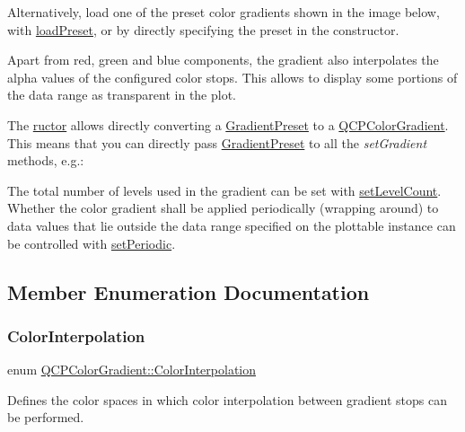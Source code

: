 Alternatively, load one of the preset color gradients shown in the image below, with \hyperlink{class_q_c_p_color_gradient_aa0aeec1528241728b9671bf8e60b1622}{load\+Preset}, or by directly specifying the preset in the constructor.

Apart from red, green and blue components, the gradient also interpolates the alpha values of the configured color stops. This allows to display some portions of the data range as transparent in the plot.



The \hyperlink{class_q_c_p_color_gradient}{ructor} allows directly converting a \hyperlink{class_q_c_p_color_gradient_aed6569828fee337023670272910c9072}{Gradient\+Preset} to a \hyperlink{class_q_c_p_color_gradient}{Q\+C\+P\+Color\+Gradient}. This means that you can directly pass \hyperlink{class_q_c_p_color_gradient_aed6569828fee337023670272910c9072}{Gradient\+Preset} to all the {\itshape set\+Gradient} methods, e.\+g.\+: 
\begin{DoxyCodeInclude}
\end{DoxyCodeInclude}
 The total number of levels used in the gradient can be set with \hyperlink{class_q_c_p_color_gradient_a18da587eb4f7fc788ea28ba15b6a12de}{set\+Level\+Count}. Whether the color gradient shall be applied periodically (wrapping around) to data values that lie outside the data range specified on the plottable instance can be controlled with \hyperlink{class_q_c_p_color_gradient_a39d6448155fc00a219f239220d14bb39}{set\+Periodic}. 

\subsection{Member Enumeration Documentation}
\mbox{\label{class_q_c_p_color_gradient_ac5dca17cc24336e6ca176610e7f77fc1}} 
\subsubsection{\texorpdfstring{Color\+Interpolation}{ColorInterpolation}}
{\footnotesize\ttfamily enum \hyperlink{class_q_c_p_color_gradient_ac5dca17cc24336e6ca176610e7f77fc1}{Q\+C\+P\+Color\+Gradient\+::\+Color\+Interpolation}}

Defines the color spaces in which color interpolation between gradient stops can be performed.

